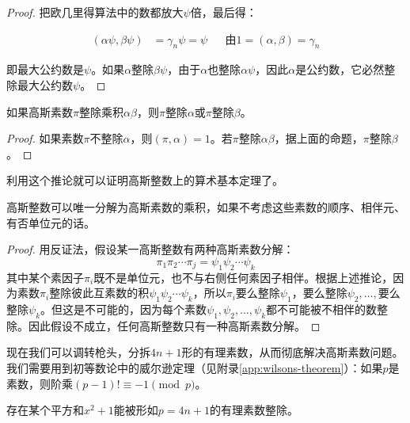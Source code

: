 \documentclass[b5paper]{ctexart}
\begin{document}
\begin{proof}
把欧几里得算法中的数都放大$\psi$倍，最后得：

\begin{align*}
(\alpha \psi, \beta \psi) &= \gamma_n \psi = \psi  && \text{由} 1 = (\alpha, \beta) = \gamma_n
\end{align*}

即最大公约数是$\psi$。如果$\alpha$整除$\beta \psi$，由于$\alpha$也整除$\alpha \psi$，因此$\alpha$是公约数，它必然整除最大公约数$\psi$。
\end{proof}

\begin{corollary}\label{thm:Gaussian-primary}
如果高斯素数$\pi$整除乘积$\alpha \beta$，则$\pi$整除$\alpha$或$\pi$整除$\beta$。
\end{corollary}

\begin{proof}
如果素数$\pi$不整除$\alpha$，则$(\pi, \alpha) = 1$。若$\pi$整除$\alpha \beta$，据上面的命题，$\pi$整除$\beta$。
\end{proof}

利用这个推论就可以证明高斯整数上的算术基本定理了。

\begin{theorem}[高斯整数上的算术基本定理]
高斯整数可以唯一分解为高斯素数的乘积，如果不考虑这些素数的顺序、相伴元、有否单位元的话。
\end{theorem}

\begin{proof}
用反证法，假设某一高斯整数有两种高斯素数分解：
\[
\pi_1 \pi_2 \dotsm \pi_j = \psi_1 \psi_2 \dotsm \psi_k
\]
其中某个素因子$\pi_i$既不是单位元，也不与右侧任何素因子相伴。根据上述推论，因为素数$\pi_i$整除彼此互素数的积$\psi_1 \psi_2 \dotsm \psi_k$，所以$\pi_i$要么整除$\psi_1$，要么整除$\psi_2, \dotsc, $要么整除$\psi_k$。但这是不可能的，因为每个素数$\psi_1, \psi_2, \dotsc, \psi_k$都不可能被不相伴的数整除。因此假设不成立，任何高斯整数只有一种高斯素数分解。
\end{proof}

现在我们可以调转枪头，分拆$4n + 1$形的有理素数，从而彻底解决高斯素数问题。我们需要用到初等数论中的威尔逊定理（见附录\ref{app:wilsons-theorem}）：如果$p$是素数，则阶乘$(p - 1)! \equiv -1 \pmod p$。

\begin{lemma}
存在某个平方和$x^2 + 1$能被形如$p = 4n + 1$的有理素数整除。
\end{lemma}
\end{document}

